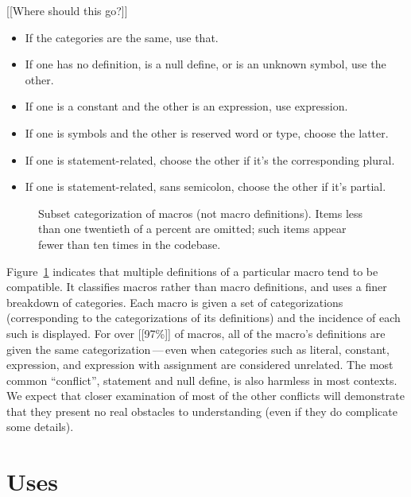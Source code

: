 \documentclass[10pt]{article}
\begin{document}
[[Where should this go?]]
\begin{itemize}
\item If the categories are the same, use that.

\item If one has no definition, is a null define, or is an unknown symbol, use
the other.

\item If one is a constant and the other is an expression, use expression.

\item If one is symbols and the other is reserved word or type, choose the latter.

\item If one is statement-related, choose the other if it's the corresponding plural.
\item If one is statement-related, sans semicolon, choose the other if it's partial.
\end{itemize}


        \begin{figure}
        {\small\centerline{}}
        \caption{Subset categorization of macros (not macro definitions).   Items
          less than one twentieth of a percent are omitted; such items appear
          fewer than ten times in the codebase.}
        \label{fig:subset-categories}
        \end{figure}

        Figure~\ref{fig:subset-categories} indicates that multiple definitions of a
        particular macro tend to be compatible.  It classifies macros rather than
        macro definitions, and uses a finer breakdown of categories.  Each macro is
        given a set of categorizations (corresponding to the categorizations of its
        definitions) and the incidence of each such is displayed.  For over [[97\%]] of
        macros, all of the macro's definitions are given the same
        categorization\,---\,even when categories such as literal, constant,
        expression, and expression with assignment are considered unrelated.  The
        most common ``conflict'', statement and null define, is also harmless in
        most contexts.  We expect that closer examination of most of the other
        conflicts will demonstrate that they present no real obstacles to
        understanding (even if they do complicate some details).


\section{Uses}
\end{document}
